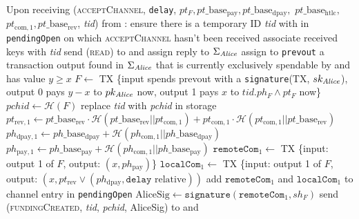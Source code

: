 \begin{algorithmic}[1]
    \State Upon receiving (\textsc{acceptChannel}, \texttt{delay}, $pt_F,
    pt\_\mathrm{base}_{\mathrm{pay}}, pt\_\mathrm{base}_{\mathrm{dpay}},$
    $pt\_\mathrm{base}_{\mathrm{htlc}},$ $pt_{\mathrm{com}, 1},
    pt\_\mathrm{base}_{\mathrm{rev}}$, \textit{tid}) from \bob:
    \Indent
      \State ensure there is a temporary ID \textit{tid} with \bob{} in
      \texttt{pendingOpen} on which \textsc{acceptChannel} hasn't been received
      \State associate received keys with \textit{tid}
      \State send (\textsc{read}) to \ledger{} and assign reply to
      $\Sigma_{\mathit{Alice}}$
      \State assign to \texttt{prevout} a transaction output found in
      $\Sigma_{\mathit{Alice}}$ that is currently exclusively spendable by \alice{} and
      has value $y \geq x$
      \State $F \gets$ TX \{input spends prevout with a \texttt{signature}(TX,
      $sk_{\mathit{Alice}}$), output 0 pays $y - x$ to $pk_{\mathit{Alice}}$ now, output 1 pays
      $x$ to $\textit{tid}.ph_F \wedge pt_F$ now\}
      \State $\mathit{pchid} \gets \mathcal{H}\left(F\right)$
      \State replace \textit{tid} with \textit{pchid} in storage
      \State $pt_{\mathrm{rev}, 1} \gets pt\_\mathrm{base}_{\mathrm{rev}} \cdot
      \mathcal{H}\left(pt\_\mathrm{base}_{\mathrm{rev}} ||
      pt_{\mathrm{com}, 1}\right) + pt_{\mathrm{com}, 1} \cdot \mathcal{H}\left(
      pt_{\mathrm{com}, 1} || pt\_\mathrm{base}_{\mathrm{rev}}\right)$
      \State $ph_{\mathrm{dpay}, 1} \gets ph\_\mathrm{base}_{\mathrm{dpay}} +
      \mathcal{H}\left(ph_{\mathrm{com}, 1} ||
      ph\_\mathrm{base}_{\mathrm{dpay}}\right)$
      \State $ph_{\mathrm{pay}, 1} \gets ph\_\mathrm{base}_{\mathrm{pay}} +
      \mathcal{H}\left(ph_{\mathrm{com}, 1} ||
      ph\_\mathrm{base}_{\mathrm{pay}}\right)$
      \State $\mathtt{remoteCom}_1 \gets$ TX \{input: output 1 of $F$, output:
      $\left(x, ph_{\mathrm{pay}}\right)$\}
      \State $\mathtt{localCom}_1 \gets$ TX \{input: output 1 of $F$, output:
      $\left(x, pt_{\mathrm{rev}} \vee \left(ph_{\mathrm{dpay}}, \mathtt{delay}
      \text{ relative}\right)\right)$ 
      \State add $\mathtt{remoteCom}_1$ and $\mathtt{localCom}_1$ to channel
      entry in \texttt{pendingOpen}
      \State $\mathrm{AliceSig} \gets
      \mathtt{signature}\left(\mathtt{remoteCom}_1, sh_F\right)$
      \State send (\textsc{fundingCreated}, \textit{tid},
      \textit{pchid}, AliceSig) to \bob{} and \adversary
    \EndIndent
    \State


\end{algorithmic}
